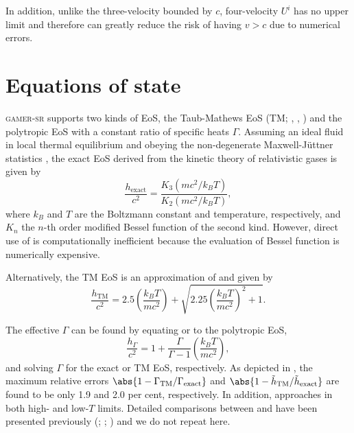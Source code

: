In addition, unlike the three-velocity bounded by $c$, four-velocity $U^i$ has no upper limit and therefore can greatly reduce the risk of having $v>c$ due to numerical errors.

\section{Equations of state}
\label{EoS}
\textsc{gamer-sr} supports two kinds of EoS, the Taub-Mathews EoS (TM; \citealt{Taub}, \citealt{TM_EOS}, \citealt{Compare_TM_EOS}) and the polytropic EoS with a constant ratio of specific heats $\Gamma$. Assuming an ideal fluid in local thermal equilibrium and obeying the non-degenerate Maxwell-J\"{u}ttner statistics \citep{Juttner}, the exact EoS \citep{Synge} derived from the kinetic theory of relativistic gases is given by
\begin{equation}
    \frac{h_{\text{exact}}}{c^2}=
    \frac{K_{3}\left(mc^2/k_{B}T\right)}
         {K_{2}\left(mc^2/k_{B}T\right)},
\label{EXACT_EOS}
\end{equation}
where $k_{B}$ and $T$ are the Boltzmann constant and temperature, respectively, and $K_{n}$ the $n$-th order modified Bessel function of the second kind. However, direct use of  is computationally inefficient because the evaluation of Bessel function is numerically expensive.

Alternatively, the TM EoS is an approximation of  and given by
\begin{equation}
\frac{h_{\text{TM}}}{c^2}=2.5\left(\frac{k_B T}{mc^2}\right)+\sqrt{2.25{\left(\frac{k_B T}{mc^2}\right)}^{2}+1}.
\label{TM EOS}
\end{equation}

The effective $\Gamma$ can be found by equating  or  to the polytropic EoS,
\begin{equation}
    \frac{h_{\Gamma}}{c^2}=
    1+\frac{\Gamma}{\Gamma-1}\left(\frac{k_{B}T}{mc^2}\right),
\end{equation}
and solving $\Gamma$ for the exact or TM EoS, respectively. As depicted in , the maximum relative errors $\abs{1-\Gamma_{\text{TM}}/\Gamma_{\text{exact}}}$ and $\abs{1-\tilde{h}_{\text{TM}}/\tilde{h}_{\text{exact}}}$ are found to be only 1.9 and 2.0 per cent, respectively.  In addition,  approaches  in both high- and low-$T$ limits. Detailed comparisons between  and  have been presented previously (\citealt{Compare_TM_EOS}; \citealt{RC_EOS}; \citealt{NR_Limit}) and we do not repeat here.

